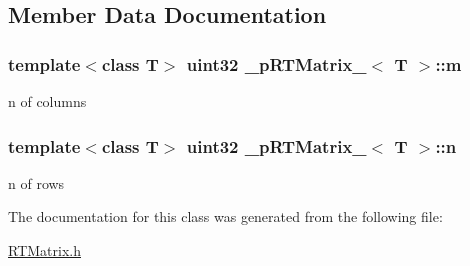 \subsection{Member Data Documentation}
\hypertarget{class__pRTMatrix___a365982f4a3d0d921a124ac0c21b63f6c}{
\subsubsection[{m}]{\setlength{\rightskip}{0pt plus 5cm}template$<$class T$>$ uint32 {\bf \_\-pRTMatrix\_\-}$<$ T $>$::{\bf m}}}
\label{class__pRTMatrix___a365982f4a3d0d921a124ac0c21b63f6c}
n of columns \hypertarget{class__pRTMatrix___aa43a04344c78d8edef929e758e8e5263}{
\subsubsection[{n}]{\setlength{\rightskip}{0pt plus 5cm}template$<$class T$>$ uint32 {\bf \_\-pRTMatrix\_\-}$<$ T $>$::{\bf n}}}
\label{class__pRTMatrix___aa43a04344c78d8edef929e758e8e5263}
n of rows 

The documentation for this class was generated from the following file:\begin{DoxyCompactItemize}
\item 
\hyperlink{RTMatrix_8h}{RTMatrix.h}\end{DoxyCompactItemize}
